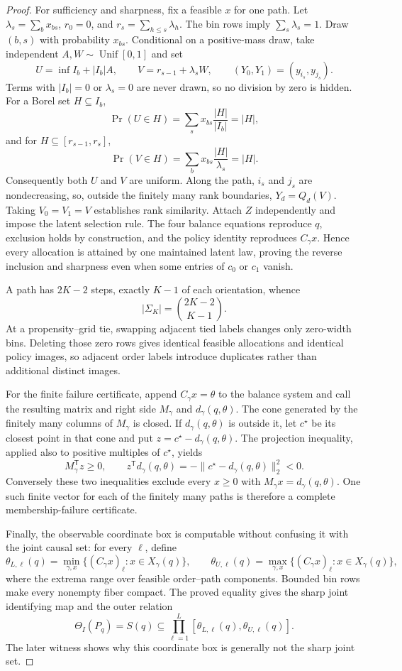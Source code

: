 \documentclass{article}
\begin{document}
\begin{proof}
For sufficiency and sharpness, fix a feasible \(x\) for one path.  Let \(\lambda_s=\sum_bx_{bs}\), \(r_0=0\), and \(r_s=\sum_{h\le s}\lambda_h\).  The bin rows imply \(\sum_s\lambda_s=1\).  Draw \((b,s)\) with probability \(x_{bs}\).  Conditional on a positive-mass draw, take independent \(A,W\sim\operatorname{Unif}[0,1]\) and set
\[
U=\inf I_b+|I_b|A,\qquad V=r_{s-1}+\lambda_sW,\qquad
(Y_0,Y_1)=(y_{i_s},y_{j_s}).
\]
Terms with \(|I_b|=0\) or \(\lambda_s=0\) are never drawn, so no division by zero is hidden.  For a Borel set \(H\subseteq I_b\),
\[
\Pr(U\in H)=\sum_sx_{bs}\frac{|H|}{|I_b|}=|H|,
\]
and for \(H\subseteq[r_{s-1},r_s]\),
\[
\Pr(V\in H)=\sum_bx_{bs}\frac{|H|}{\lambda_s}=|H|.
\]
Consequently both \(U\) and \(V\) are uniform.  Along the path, \(i_s\) and \(j_s\) are nondecreasing, so, outside the finitely many rank boundaries, \(Y_d=Q_d(V)\).  Taking \(V_0=V_1=V\) establishes rank similarity.  Attach \(Z\) independently and impose the latent selection rule.  The four balance equations reproduce \(q\), exclusion holds by construction, and the policy identity reproduces \(C_\gamma x\).  Hence every allocation is attained by one maintained latent law, proving the reverse inclusion and sharpness even when some entries of \(c_0\) or \(c_1\) vanish.

A path has \(2K-2\) steps, exactly \(K-1\) of each orientation, whence
\[
|\Sigma_K|=\binom{2K-2}{K-1}.
\]
At a propensity--grid tie, swapping adjacent tied labels changes only zero-width bins.  Deleting those zero rows gives identical feasible allocations and identical policy images, so adjacent order labels introduce duplicates rather than additional distinct images.

For the finite failure certificate, append \(C_\gamma x=\theta\) to the balance system and call the resulting matrix and right side \(M_\gamma\) and \(d_\gamma(q,\theta)\).  The cone generated by the finitely many columns of \(M_\gamma\) is closed.  If \(d_\gamma(q,\theta)\) is outside it, let \(c^\star\) be its closest point in that cone and put \(z=c^\star-d_\gamma(q,\theta)\).  The projection inequality, applied also to positive multiples of \(c^\star\), yields
\[
M_\gamma^{\mathsf T}z\ge0,\qquad
z^{\mathsf T}d_\gamma(q,\theta)=-\|c^\star-d_\gamma(q,\theta)\|_2^2<0.
\]
Conversely these two inequalities exclude every \(x\ge0\) with \(M_\gamma x=d_\gamma(q,\theta)\).  One such finite vector for each of the finitely many paths is therefore a complete membership-failure certificate.

Finally, the observable coordinate box is computable without confusing it with the joint causal set: for every \(\ell\), define
\[
\theta_{L,\ell}(q)=\min_{\gamma,x}\{(C_\gamma x)_\ell:x\in X_\gamma(q)\},\qquad
\theta_{U,\ell}(q)=\max_{\gamma,x}\{(C_\gamma x)_\ell:x\in X_\gamma(q)\},
\]
where the extrema range over feasible order--path components.  Bounded bin rows make every nonempty fiber compact.  The proved equality gives the sharp joint identifying map and the outer relation
\[
\Theta_I(P_q)=S(q)\subseteq\prod_{\ell=1}^L[\theta_{L,\ell}(q),\theta_{U,\ell}(q)].
\]
The later witness shows why this coordinate box is generally not the sharp joint set.
\end{proof}
\end{document}
